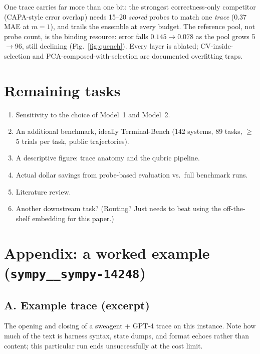 \documentclass[10pt,twocolumn]{article}
\begin{document}
One trace carries far more than one bit: the strongest correctness-only
competitor (CAPA-style error overlap) needs 15--20 \emph{scored} probes to
match one \emph{trace} (0.37 MAE at $m{=}1$), and trails the ensemble at
every budget. The reference pool, not probe count, is the binding resource:
error falls $0.145\!\to\!0.078$ as the pool grows 5$\to$96, still declining
(Fig.~\ref{fig:quench}). Every layer is ablated; CV-inside-selection and
PCA-composed-with-selection are documented overfitting traps.

\section*{Remaining tasks}
\begin{enumerate}[leftmargin=1.4em,itemsep=1pt,topsep=1pt]
  \item Sensitivity to the choice of Model~1 and Model~2.
  \item An additional benchmark, ideally Terminal-Bench (142 systems, 89
  tasks, $\geq$5 trials per task, public trajectories).
  \item A descriptive figure: trace anatomy and the qubric pipeline.
  \item Actual dollar savings from probe-based evaluation vs.\ full
  benchmark runs.
  \item Literature review.
  \item Another downstream task? (Routing? Just needs to beat using the
  off-the-shelf embedding for this paper.)
\end{enumerate}


\onecolumn
\section*{Appendix: a worked example (\texttt{sympy\_\_sympy-14248})}

\subsection*{A. Example trace (excerpt)}
The opening and closing of a sweagent + GPT-4 trace on this instance. Note
how much of the text is harness syntax, state dumps, and format echoes
rather than content; this particular run ends unsuccessfully at the cost
limit.
\end{document}
